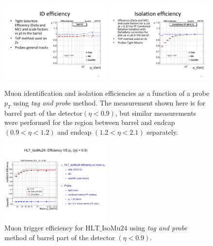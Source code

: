 \begin{figure}[htbp]
	\centering
		\includegraphics[width=0.49\textwidth]{Figures/ID_eff.pdf}
		\includegraphics[width=0.49\textwidth]{Figures/ISO_eff.pdf}
	\caption[Muon identification and isolation efficiencies using \textit{tag and probe} method.]{Muon identification and isolation efficiencies as a function of a probe $p_T$ using \textit{tag and probe} method. The measurement shown here is for barrel part of the detector$(\eta<0.9)$, but similar measurements were performed for the region between barrel and endcap$(0.9<\eta<1.2)$ and endcap $(1.2<\eta<2.1)$ separately.}
	\label{fig:eff_IDISO}
\end{figure}

\begin{figure}[htbp]
	\centering
		\includegraphics[width=0.5\textwidth]{Figures/trig_eff.pdf}
	\caption[Muon trigger efficiency using \textit{tag and probe} method.]{Muon trigger efficiency for $\mathrm{HLT\_IsoMu24}$ using \textit{tag and probe} method of barrel part of the detector $(\eta<0.9)$.}
	\label{fig:eff_trig}
\end{figure}  

